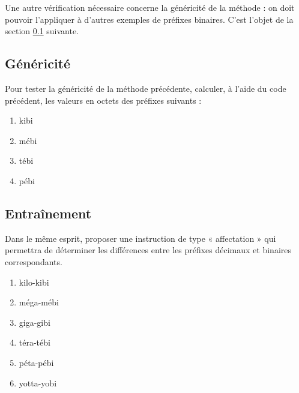 Une autre vérification nécessaire concerne la généricité de la méthode : 
on doit pouvoir l'appliquer à d'autres exemples de préfixes binaires.
C'est l'objet de la section \ref{affectation:informatique:genericite} suivante.

\subsection{Généricité}\label{affectation:informatique:genericite}
Pour tester la généricité de la méthode précédente, calculer, à l'aide du code \python{} précédent,
les valeurs en octets des préfixes suivants :

\begin{minipage}[t]{7.5cm}
\begin{enumerate}
\item kibi
\item mébi
\end{enumerate}
\end{minipage}
\hfill
\begin{minipage}[t]{7.5cm}
\begin{enumerate}\setcounter{enumi}{2}
\item tébi
\item pébi
\end{enumerate}
\end{minipage}

\subsection{Entraînement}\label{affectation:informatique:entrainement}
Dans le même esprit, proposer une instruction de type « affectation » qui permettra 
de déterminer les différences entre les préfixes décimaux et binaires correspondants.

\begin{minipage}[t]{7.5cm}
\begin{enumerate}
\item kilo-kibi
\item méga-mébi
\item giga-gibi
\end{enumerate}
\end{minipage}
\hfill
\begin{minipage}[t]{7.5cm}
\begin{enumerate}\setcounter{enumi}{3}
\item téra-tébi
\item péta-pébi
\item yotta-yobi
\end{enumerate}
\end{minipage}

